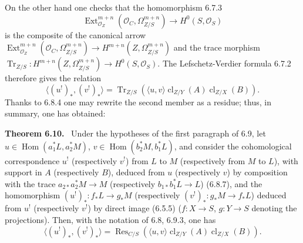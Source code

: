 \documentclass[11pt]{article}
\newenvironment{statement}[1]{\par\medskip\noindent\textbf{#1.}\ }{\par\medskip}
\DeclareMathOperator{\Hom}{Hom}
\DeclareMathOperator{\Ext}{Ext}
\providecommand{\cl}{\operatorname{cl}}
\providecommand{\OO}{\mathcal{O}}
\providecommand{\Hom}{\operatorname{Hom}}
\providecommand{\cl}{\operatorname{cl}}
\providecommand{\Hom}{\operatorname{Hom}}
\providecommand{\cl}{\operatorname{cl}}
\begin{document}
On the other hand one checks that the homomorphism 6.7.3
\[
\Ext^{m+n}_{\OO_Z}(\OO_C,\Omega^{m+n}_{Z/S})\longrightarrow H^0(S,\OO_S)
\]
is the composite of the canonical arrow $\Ext^{m+n}_{\OO_Z}(\OO_C,\Omega^{m+n}_{Z/S})\to H^{m+n}(Z,\Omega^{m+n}_{Z/S})$ and the trace morphism $\operatorname{Tr}_{Z/S}:H^{m+n}(Z,\Omega^{m+n}_{Z/S})\to H^0(S,\OO_S)$. The Lefschetz-Verdier formula 6.7.2 therefore gives the relation
\begin{equation}
\tag{6.9.5}
\langle (u^!)_*,(v^!)_*\rangle=\operatorname{Tr}_{Z/S}(\langle u,v\rangle\cl_{Z/Y}(A)\cl_{Z/X}(B)).
\end{equation}
Thanks to 6.8.4 one may rewrite the second member as a residue; thus, in summary, one has obtained:


\begin{statement}{Theorem 6.10}
Under the hypotheses of the first paragraph of 6.9, let $u\in\Hom(a_1^*L,a_2^*M)$, $v\in\Hom(b_2^*M,b_1^*L)$, and consider the cohomological correspondence $u^!$ (respectively $v^!$) from $L$ to $M$ (respectively from $M$ to $L$), with support in $A$ (respectively $B$), deduced from $u$ (respectively $v$) by composition with the trace $a_{2*}a_2^*M\to M$ (respectively $b_{1*}b_1^*L\to L$) (6.8.7), and the homomorphism $(u^!)_*:f_*L\to g_*M$ (respectively $(v^!)_*:g_*M\to f_*L$) deduced from $u^!$ (respectively $v^!$) by direct image (6.5.5) ($f:X\to S$, $g:Y\to S$ denoting the projections). Then, with the notation of 6.8, 6.9.3, one has
\begin{equation}
\tag{6.10.1}
\langle (u^!)_*,(v^!)_*\rangle=\operatorname{Res}_{C/S}(\langle u,v\rangle\cl_{Z/Y}(A)\cl_{Z/X}(B)).
\end{equation}
\end{statement}
\end{document}
